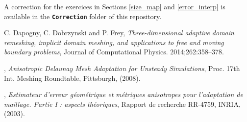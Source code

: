 \documentclass{article}
\newcommand{\ttb}[1]{\texttt{\textbf{#1}}}
\begin{document}
A correction for the exercices in Sections \ref{size_map} and
\ref{error_interp} is available in the \ttb{Correction} folder of this repository.

\begin{thebibliography}{00}

{\sc C. Dapogny, C. Dobrzynski and P. Frey}, {\em Three-dimensional adaptive domain remeshing,
  implicit domain meshing, and applications to free and moving boundary
  problems}, Journal of Computational Physics. 2014;\hspace{0pt}262:358--378.

, {\em Anisotropic Delaunay Mesh Adaptation for Unsteady Simulations}, Proc. 17th Int. Meshing Roundtable, Pittsburgh, (2008).

, {\em Estimateur d’erreur géométrique et métriques anisotropes pour
l’adaptation de maillage. Partie I : aspects théoriques}, Rapport de recherche RR-4759, INRIA, (2003).

\end{thebibliography}
\end{document}
